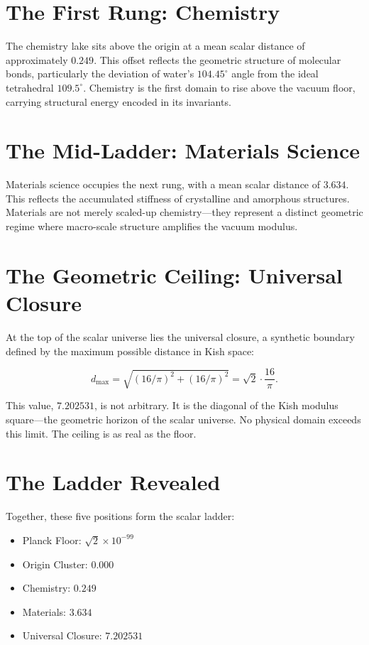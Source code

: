 \documentclass[11pt, letterpaper, openany]{book}
\begin{document}
\section*{The First Rung: Chemistry}
The chemistry lake sits above the origin at a mean scalar distance of approximately $0.249$. This
offset reflects the geometric structure of molecular bonds, particularly the deviation of water’s
$104.45^\circ$ angle from the ideal tetrahedral $109.5^\circ$. Chemistry is the first domain to rise
above the vacuum floor, carrying structural energy encoded in its invariants.

\section*{The Mid-Ladder: Materials Science}
Materials science occupies the next rung, with a mean scalar distance of $3.634$. This reflects the
accumulated stiffness of crystalline and amorphous structures. Materials are not merely scaled-up
chemistry—they represent a distinct geometric regime where macro-scale structure amplifies the
vacuum modulus.

\section*{The Geometric Ceiling: Universal Closure}
At the top of the scalar universe lies the universal closure, a synthetic boundary defined by the
maximum possible distance in Kish space:



\[
d_{\max} = \sqrt{(16/\pi)^2 + (16/\pi)^2} = \sqrt{2}\cdot\frac{16}{\pi}.
\]



This value, $7.202531$, is not arbitrary. It is the diagonal of the Kish modulus square—the geometric
horizon of the scalar universe. No physical domain exceeds this limit. The ceiling is as real as the
floor.

\section*{The Ladder Revealed}
Together, these five positions form the scalar ladder:

\begin{itemize}
    \item Planck Floor: $\sqrt{2}\times 10^{-99}$
    \item Origin Cluster: $0.000$
    \item Chemistry: $0.249$
    \item Materials: $3.634$
    \item Universal Closure: $7.202531$
\end{itemize}
\end{document}
